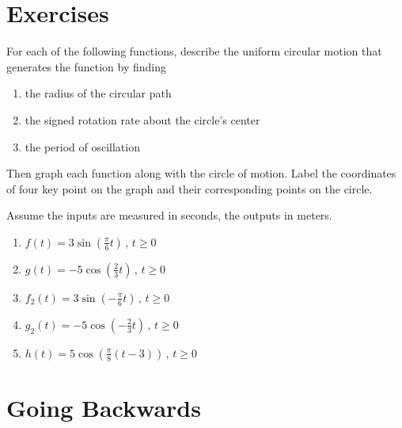 \documentclass{ximera}
\begin{document}
\section{Exercises}

\begin{exercise} \label{ExLOD54r3fsdf}
For each of the following functions, describe the uniform circular motion that generates the function by finding
\begin{enumerate}
\item the radius of the circular path

\item the signed rotation rate about the circle's center

\item the period of oscillation 

\end{enumerate}

Then graph each function along with the circle of motion. Label the coordinates of four key point on the graph and their corresponding points on the circle.

 Assume the inputs are measured in seconds, the outputs in meters.

\begin{enumerate}
\item $f(t)=3\sin \left( \frac{\pi}{6}t \right) \, , \, t\geq 0$

\item $g(t)=-5\cos \left( \frac{2}{3}t \right) \, , \, t\geq 0$

\item $f_2(t)=3\sin \left(- \frac{\pi}{6}t \right) \, , \, t\geq 0$

\item $g_2(t)=-5\cos \left( -\frac{2}{3}t \right) \, , \, t\geq 0$

\item $h(t)=5\cos \left( \frac{\pi}{8}\left( t - 3 \right) \right) \, , \, t\geq 0$
\end{enumerate}

\end{exercise}


\section{Going Backwards}
\end{document}
